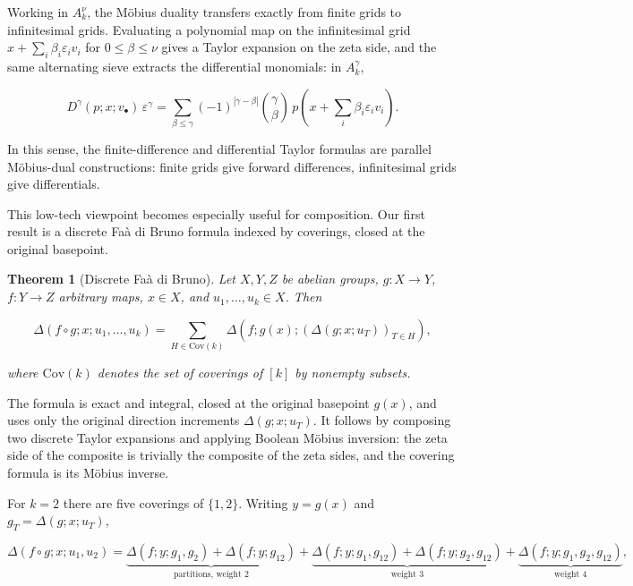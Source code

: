 \documentclass[10pt,a4paper]{article}
\theoremstyle{plain}
\newtheorem{theorem}{Theorem}
\theoremstyle{definition}
\newcommand{\1}{\mathbb{1}} %
\newcommand{\set}[1]{\{#1\}} %
\newcommand{\eps}{\varepsilon} %
\newcommand{\Cov}{\mathrm{Cov}} %
\begin{document}
Working in \(A_k^\nu\), the Möbius duality transfers exactly from finite
grids to infinitesimal grids. Evaluating a polynomial map on the
infinitesimal grid \(x + \sum_i \beta_i \eps_i v_i\) for
\(0 \leq \beta \leq \nu\) gives a Taylor expansion on the zeta side, and
the same alternating sieve extracts the differential monomials: in
\(A_k^\gamma\),

\[
  D^\gamma(p; x; v_\bullet)\, \eps^\gamma = \sum_{\beta \leq \gamma} (-1)^{|\gamma - \beta|} \binom{\gamma}{\beta}\, p(x + {\textstyle\sum_i} \beta_i \eps_i v_i).
\]

In this sense, the finite-difference and differential Taylor formulas
are parallel Möbius-dual constructions: finite grids give forward
differences, infinitesimal grids give differentials.

This low-tech viewpoint becomes especially useful for composition. Our
first result is a discrete Faà di Bruno formula indexed by coverings,
closed at the original basepoint.

\begin{theorem}[Discrete Faà di Bruno]

Let \(X, Y, Z\) be abelian groups, \(g: X \to Y\), \(f: Y \to Z\)
arbitrary maps, \(x \in X\), and \(u_1, \dots, u_k \in X\). Then

\[
  \Delta(f \circ g; x; u_1, \dots, u_k) = \sum_{H \in \Cov(k)} \Delta(f; g(x); (\Delta(g; x; u_T))_{T \in H}),
\]

where \(\Cov(k)\) denotes the set of coverings of \([k]\) by nonempty
subsets.

\end{theorem}

The formula is exact and integral, closed at the original basepoint
\(g(x)\), and uses only the original direction increments
\(\Delta(g; x; u_T)\). It follows by composing two discrete Taylor
expansions and applying Boolean Möbius inversion: the zeta side of the
composite is trivially the composite of the zeta sides, and the covering
formula is its Möbius inverse.

For \(k = 2\) there are five coverings of \(\set{1,2}\). Writing
\(y = g(x)\) and \(g_T = \Delta(g; x; u_T)\),

\[
  \Delta(f \circ g; x; u_1, u_2)
  = \underbrace{\Delta(f; y; g_1, g_2) + \Delta(f; y; g_{12})}_{\text{partitions, weight } 2}
  + \underbrace{\Delta(f; y; g_1, g_{12}) + \Delta(f; y; g_2, g_{12})}_{\text{weight } 3}
  + \underbrace{\Delta(f; y; g_1, g_2, g_{12})}_{\text{weight } 4},
\]
\end{document}
